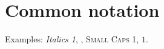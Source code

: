 \chapter{Common notation}%
\label{cha:common-notation}
Examples: \textit{Italics 1}, , \textsc{Small
Caps 1},  $1$.
